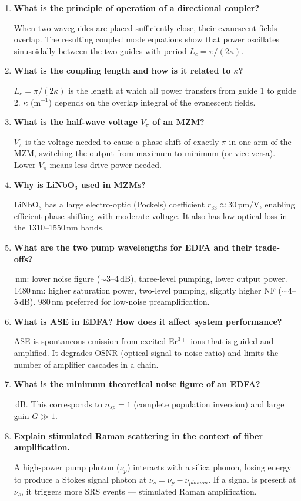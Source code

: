 \documentclass[12pt,a4paper]{article}
\newcommand{\Q}[1]{\textbf{#1}\par\noindent\ignorespaces}
\begin{document}
\begin{tcolorbox}[exambox, title={\textbf{Frequently Asked / Viva Questions}}]
\begin{enumerate}[topsep=0pt, label=\textbf{Q\arabic*.}, itemsep=5pt]
  \item \Q{What is the principle of operation of a directional coupler?}
    When two waveguides are placed sufficiently close, their evanescent fields overlap. The resulting coupled mode equations show that power oscillates sinusoidally between the two guides with period $L_c = \pi/(2\kappa)$.
  \item \Q{What is the coupling length and how is it related to $\kappa$?}
    $L_c = \pi/(2\kappa)$ is the length at which all power transfers from guide 1 to guide 2. $\kappa$ (m$^{-1}$) depends on the overlap integral of the evanescent fields.
  \item \Q{What is the half-wave voltage $V_\pi$ of an MZM?}
    $V_\pi$ is the voltage needed to cause a phase shift of exactly $\pi$ in one arm of the MZM, switching the output from maximum to minimum (or vice versa). Lower $V_\pi$ means less drive power needed.
  \item \Q{Why is LiNbO$_3$ used in MZMs?}
    LiNbO$_3$ has a large electro-optic (Pockels) coefficient $r_{33} \approx 30$\,pm/V, enabling efficient phase shifting with moderate voltage. It also has low optical loss in the 1310--1550\,nm bands.
  \item \Q{What are the two pump wavelengths for EDFA and their trade-offs?}
    980\,nm: lower noise figure ($\sim$3--4\,dB), three-level pumping, lower output power. 1480\,nm: higher saturation power, two-level pumping, slightly higher NF ($\sim$4--5\,dB). 980\,nm preferred for low-noise preamplification.
  \item \Q{What is ASE in EDFA? How does it affect system performance?}
    ASE is spontaneous emission from excited Er$^{3+}$ ions that is guided and amplified. It degrades OSNR (optical signal-to-noise ratio) and limits the number of amplifier cascades in a chain.
  \item \Q{What is the minimum theoretical noise figure of an EDFA?}
    3\,dB. This corresponds to $n_{sp} = 1$ (complete population inversion) and large gain $G \gg 1$.
  \item \Q{Explain stimulated Raman scattering in the context of fiber amplification.}
    A high-power pump photon ($\nu_p$) interacts with a silica phonon, losing energy to produce a Stokes signal photon at $\nu_s = \nu_p - \nu_{phonon}$. If a signal is present at $\nu_s$, it triggers more SRS events --- stimulated Raman amplification.

\end{enumerate}
\end{tcolorbox}
\end{document}
